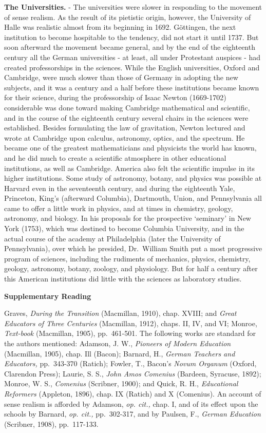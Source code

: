 \documentclass[]{book}
\begin{document}
\textbf{The Universities.} - The universities were slower in responding to the movement of sense realism. As the result of its pietistic origin, however, the University of Halle was realistic almost from its beginning in 1692. Göttingen, the next institution to become hospitable to the tendency, did not start it until 1737. But soon afterward the movement became general, and by the end of the eighteenth century all the German universities - at least, all under Protestant auspices - had created professorships in the sciences. While the English universities, Oxford and Cambridge, were much slower than those of Germany in adopting the new subjects, and it was a century and a half before these institutions became known for their science, during the professorship of Isaac Newton (1669-1702) considerable was done toward making Cambridge mathematical and scientific, and in the course of the eighteenth century several chairs in the sciences were established. Besides formulating the law of gravitation, Newton lectured and wrote at Cambridge upon calculus, astronomy, optics, and the spectrum. He became one of the greatest mathematicians and physicists the world has known, and he did much to create a scientific atmosphere in other educational institutions, as well as Cambridge. America also felt the scientific impulse in its higher institutions. Some study of astronomy, botany, and physics was possible at Harvard even in the seventeenth century, and during the eighteenth Yale, Princeton, King's (afterward Columbia), Dartmouth, Union, and Pennsylvania all came to offer a little work in physics, and at times in chemistry, geology, astronomy, and biology. In his proposals for the prospective `seminary' in New York (1753), which was destined to become Columbia University, and in the actual course of the academy at Philadelphia (later the University of Pennsylvania), over which he presided, Dr.~William Smith put a most progressive program of sciences, including the rudiments of mechanics, physics, chemistry, geology, astronomy, botany, zoology, and physiology. But for half a century after this American institutions did little with the sciences as laboratory studies.

\textbf{Supplementary Reading}

Graves, \emph{During the Transition} (Macmillan, 1910), chap. XVIII; and \emph{Great Educators of Three Centuries} (Macmillan, 1912), chaps. II, IV, and VI; Monroe, \emph{Text-book} (Macmillan, 1905), pp.~461-501. The following works are standard for the authors mentioned: Adamson, J. W., \emph{Pioneers of Modern Education} (Macmillan, 1905), chap. Ill (Bacon); Barnard, H., \emph{German Teachers and Educators,} pp.~343-370 (Ratich); Fowler, T., Bacon's \emph{Novum Organum} (Oxford, Clarendon Press); Laurie, S. S., \emph{John Amos Comenius} (Bardeen, Syracuse, 1892); Monroe, W. S., \emph{Comenius} (Scribner, 1900); and Quick, R. H., \emph{Educational Reformers} (Appleton, 1896), chap. IX (Ratich) and X (Comenius). An account of sense realism is afforded by Adamson, \emph{op. cit.,} chap. I, and of its effect upon the schools by Barnard, \emph{op. cit.,} pp.~302-317, and by Paulsen, F., \emph{German Education} (Scribner, 1908), pp.~117-133.
\end{document}
